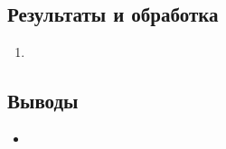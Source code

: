 \documentclass[12pt]{article}
\begin{document}
    \subsection*{Результаты и обработка}
    \begin{enumerate}
        \item
    \end{enumerate}

    \subsection*{Выводы}
    \begin{itemize}
        \item
    \end{itemize}
\end{document}

